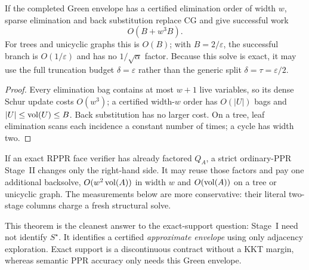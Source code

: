 \begin{corollary}
\label{cor:short-green-structural}
If the completed Green envelope has a certified elimination order of width
$w$, sparse elimination and back substitution replace CG and give successful
work
\begin{equation*}
 O(B+w^3B).
\end{equation*}
For trees and unicyclic graphs this is $O(B)$; with $B=2/\varepsilon$, the
successful branch is $O(1/\varepsilon)$ and has no
$1/\sqrt\alpha$ factor.
Because this solve is exact, it may use the full truncation budget
$\delta=\varepsilon$ rather than the generic split
$\delta=\tau=\varepsilon/2$.
\end{corollary}

\begin{proof}
Every elimination bag contains at most $w+1$ live variables, so its dense
Schur update costs $O(w^3)$; a certified width-$w$ order has $O(|U|)$ bags and
$|U|\leq\operatorname{vol}(U)\leq B$.  Back substitution has no larger cost.  On a tree,
leaf elimination scans each incidence a constant number of times; a cycle has
width two.
\end{proof}

If an exact RPPR face verifier has already factored $Q_A$, a strict
ordinary-PPR Stage~II changes only the right-hand side.  It may reuse those
factors and pay one additional backsolve, $O(w^2\operatorname{vol}(A))$ in width $w$ and
$O(\operatorname{vol}(A))$ on a tree or unicyclic graph.  The measurements below are more
conservative: their literal two-stage columns charge a fresh structural solve.

This theorem is the cleanest answer to the exact-support question: Stage~I
need not identify $S^\star$.  It identifies a certified \emph{approximate
envelope} using only adjacency exploration.  Exact support is a discontinuous
contract without a KKT margin, whereas semantic PPR accuracy only needs this
Green envelope.


